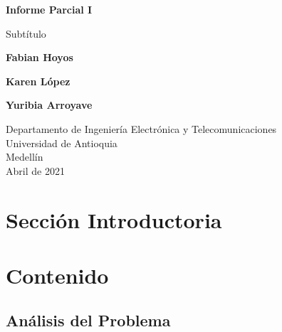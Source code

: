 \documentclass{article}
\begin{document}
\begin{titlepage}
    \begin{center}
        \vspace*{1cm}
            
        \Huge
        \textbf{Informe Parcial I}
            
        \vspace{0.5cm}
        \LARGE
        Subtítulo
            
        \vspace{1.5cm}
            
        \textbf{Fabian Hoyos}
        
        \vspace{1.5cm}
        
        \textbf{Karen López}
        
        \vspace{1.5cm}
        
        \textbf{Yuribia Arroyave}
            
        \vfill
            
        \vspace{0.8cm}
            
        \Large
        Departamento de Ingeniería Electrónica y Telecomunicaciones\\
        Universidad de Antioquia\\
        Medellín\\
       Abril de 2021
            
    \end{center}
\end{titlepage}

\tableofcontents
\newpage
\section{Sección Introductoria}\label{intro}

\section{Contenido} \label{contenido}

\subsection{Análisis del Problema}
\end{document}
